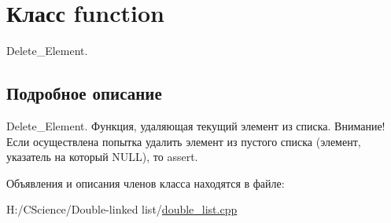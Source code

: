 \hypertarget{classfunction}{
\section{Класс function}
\label{classfunction}
}


Delete\_\-Element.  




\subsection{Подробное описание}
Delete\_\-Element. Функция, удаляющая текущий элемент из списка. Внимание! Если осуществлена попытка удалить элемент из пустого списка (элемент, указатель на который NULL), то assert. 

Объявления и описания членов класса находятся в файле:\begin{DoxyCompactItemize}
\item 
H:/CScience/Double-\/linked list/\hyperlink{double__list_8cpp}{double\_\-list.cpp}\end{DoxyCompactItemize}
